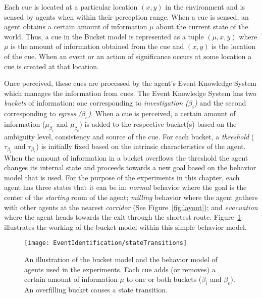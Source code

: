 Each cue is located at a particular location $(x,y)$ in the environment and is sensed by agents when within their perception range. When a cue is sensed, an agent obtains a certain amount of information $\mu$ about the current state of the world. Thus, a cue in the Bucket model is represented as a tuple $(\mu, x, y)$ where $\mu$ is the amount of information obtained from the cue and $(x,y)$ is the location of the cue. When an event or an action of significance occurs at some location a cue is created at that location.


Once perceived, these cues are processed by the agent's Event Knowledge System which manages the information from cues. The Event Knowledge System has two \emph{buckets}  of information: one corresponding to \emph{investigation ($\beta_{i}$)} and the second corresponding to \emph{egress ($\beta_{e}$)}. When a cue is perceived, a certain amount of information ($\mu_{\beta_{i}}$ and $\mu_{\beta_{e}}$) is added to the respective bucket(s) based on the ambiguity level, consistency and source of the cue.  For each bucket, a \emph{threshold} ($\tau_{\beta_{i}}$ and $\tau_{\beta_{e}}$) is initially fixed  based on the intrinsic characteristics of the agent. When the amount of information in a bucket overflows the threshold the agent changes its internal state and proceeds towards a new goal based on the behavior model that is used. For the purpose of the experiments in this chapter, each agent has three states that it can be in: \emph{normal} behavior where the goal is the center of the \emph{starting} room of the agent; \emph{milling} behavior where the agent gathers with other agents at the nearest \emph{corridor} (See Figure~\ref{fig:layout}); and \emph{evacuation} where the agent heads towards the exit through the shortest route. Figure~\ref{fig:stateTransitions} illustrates the working of the bucket model within this simple behavior model.

\begin{figure}[!t]
    \begin{center}
        \texttt{[image: EventIdentification/stateTransitions]}
    \end{center}
    \caption[An illustration of the bucket model]{An illustration of the bucket model and the behavior model of agents used in the experiments. Each cue adds (or removes) a certain amount of information $\mu$ to one or both buckets ($\beta_{i}$ and $\beta_{e}$). An overfilling bucket causes a state transition.}
    \label{fig:stateTransitions}
\end{figure}

